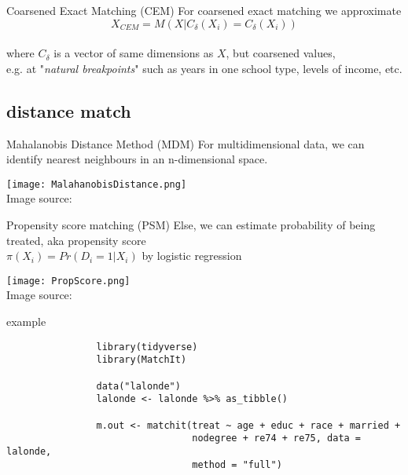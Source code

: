 \documentclass[aspectratio=169]{beamer}
\begin{document}
		\begin{frame}{Coarsened Exact Matching (CEM)}
			For coarsened exact matching we approximate
			\\ \vspace*{.5cm}
			\begin{equation}
				X_{CEM} = M(X|C_\delta(X_i) = C_\delta(X_i))
			\end{equation}
			\\ \vspace*{.5cm}
			where $C_\delta$ is a vector of same dimensions as $X$, but coarsened values, \\
			e.g. at "\textit{natural breakpoints}" such as years in one school type, levels of income, etc.
		\end{frame}

	\subsection{distance match}
		\begin{frame}{Mahalanobis Distance Method (MDM)}
			For multidimensional data, we can identify nearest neighbours in an n-dimensional space.
			\begin{center}
				\texttt{[image: MalahanobisDistance.png]}
				\\\tiny{ Image source: \href{https://humboldt-wi.github.io/blog/research/applied_predictive_modeling_19/matching_methods/}{\underline{}}}
			\end{center}
		\end{frame}

		\begin{frame}{Propensity score matching (PSM)}
			Else, we can estimate probability of being treated, aka propensity score \\
			 $\pi(X_i) = Pr(D_i = 1 | X_i)$ by logistic regression
			\begin{center}
				\texttt{[image: PropScore.png]}
				\\\tiny{ Image source: \href{https://humboldt-wi.github.io/blog/research/applied_predictive_modeling_19/matching_methods/}{\underline{}}}
			\end{center}
		\end{frame}

		\begin{frame}[fragile]{example}
				\begin{verbatim}
				library(tidyverse)
				library(MatchIt)

				data("lalonde")
				lalonde <- lalonde %>% as_tibble()

				m.out <- matchit(treat ~ age + educ + race + married +
				                 nodegree + re74 + re75, data = lalonde,
				                 method = "full")
			\end{verbatim}
		\end{frame}
\end{document}
